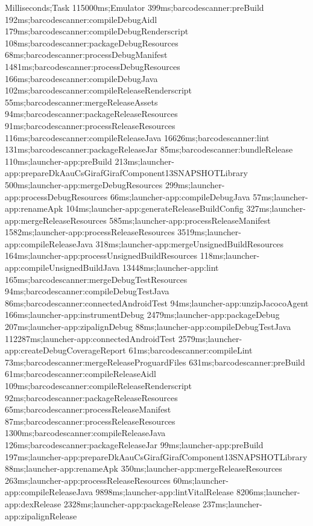 \begin{gradlecode}[caption=Running time of tasks of new dependency system with limited targets,label=lst:full_data_new_dep_system_1]
Milliseconds;Task
115000ms;Emulator
399ms;barcodescanner:preBuild
192ms;barcodescanner:compileDebugAidl
179ms;barcodescanner:compileDebugRenderscript
108ms;barcodescanner:packageDebugResources
68ms;barcodescanner:processDebugManifest
1481ms;barcodescanner:processDebugResources
166ms;barcodescanner:compileDebugJava
102ms;barcodescanner:compileReleaseRenderscript
55ms;barcodescanner:mergeReleaseAssets
94ms;barcodescanner:packageReleaseResources
91ms;barcodescanner:processReleaseResources
116ms;barcodescanner:compileReleaseJava
16626ms;barcodescanner:lint
131ms;barcodescanner:packageReleaseJar
85ms;barcodescanner:bundleRelease
110ms;launcher-app:preBuild
213ms;launcher-app:prepareDkAauCsGirafGirafComponent13SNAPSHOTLibrary
500ms;launcher-app:mergeDebugResources
299ms;launcher-app:processDebugResources
66ms;launcher-app:compileDebugJava
57ms;launcher-app:renameApk
104ms;launcher-app:generateReleaseBuildConfig
327ms;launcher-app:mergeReleaseResources
585ms;launcher-app:processReleaseManifest
1582ms;launcher-app:processReleaseResources
3519ms;launcher-app:compileReleaseJava
318ms;launcher-app:mergeUnsignedBuildResources
164ms;launcher-app:processUnsignedBuildResources
118ms;launcher-app:compileUnsignedBuildJava
13448ms;launcher-app:lint
165ms;barcodescanner:mergeDebugTestResources
94ms;barcodescanner:compileDebugTestJava
86ms;barcodescanner:connectedAndroidTest
94ms;launcher-app:unzipJacocoAgent
166ms;launcher-app:instrumentDebug
2479ms;launcher-app:packageDebug
207ms;launcher-app:zipalignDebug
88ms;launcher-app:compileDebugTestJava
112287ms;launcher-app:connectedAndroidTest
2579ms;launcher-app:createDebugCoverageReport
61ms;barcodescanner:compileLint
73ms;barcodescanner:mergeReleaseProguardFiles
631ms;barcodescanner:preBuild
61ms;barcodescanner:compileReleaseAidl
109ms;barcodescanner:compileReleaseRenderscript
92ms;barcodescanner:packageReleaseResources
65ms;barcodescanner:processReleaseManifest
87ms;barcodescanner:processReleaseResources
1300ms;barcodescanner:compileReleaseJava
126ms;barcodescanner:packageReleaseJar
99ms;launcher-app:preBuild
197ms;launcher-app:prepareDkAauCsGirafGirafComponent13SNAPSHOTLibrary
88ms;launcher-app:renameApk
350ms;launcher-app:mergeReleaseResources
263ms;launcher-app:processReleaseResources
60ms;launcher-app:compileReleaseJava
9898ms;launcher-app:lintVitalRelease
8206ms;launcher-app:dexRelease
2328ms;launcher-app:packageRelease
237ms;launcher-app:zipalignRelease
\end{gradlecode}

